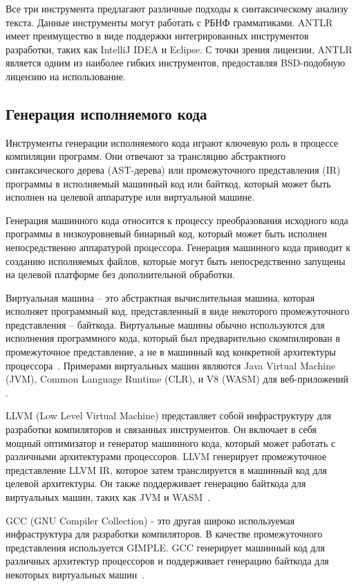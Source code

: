 Все три инструмента предлагают различные подходы к синтаксическому анализу текста.
Данные инструменты могут работать с РБНФ грамматиками.
ANTLR имеет преимущество в виде поддержки интегрированных инструментов разработки, таких как IntelliJ IDEA и Eclipse.
С точки зрения лицензии, ANTLR является одним из наиболее гибких инструментов, предоставляя BSD-подобную лицензию на использование.




\subsection{Генерация исполняемого кода}


Инструменты генерации исполняемого кода играют ключевую роль в процессе компиляции программ.
Они отвечают за трансляцию абстрактного синтаксического дерева (AST-дерева) или промежуточного представления (IR) программы в исполняемый машинный код или байткод, который может быть исполнен на целевой аппаратуре или виртуальной машине.


Генерация машинного кода относится к процессу преобразования исходного кода программы в низкоуровневый бинарный код, который может быть исполнен непосредственно аппаратурой процессора.
Генерация машинного кода приводит к созданию исполняемых файлов, которые могут быть непосредственно запущены на целевой платформе без дополнительной обработки.

Виртуальная машина -- это абстрактная вычислительная машина, которая исполняет программный код, представленный в виде некоторого промежуточного представления -- байткода.
Виртуальные машины обычно используются для исполнения программного кода, который был предварительно скомпилирован в промежуточное представление, а не в машинный код конкретной архитектуры процессора~\cite{appel1989runtime}.
Примерами виртуальных машин являются Java Virtual Machine (JVM), Common Language Runtime (CLR), и V8 (WASM) для веб-приложений .



LLVM (Low Level Virtual Machine) представляет собой инфраструктуру для разработки компиляторов и связанных инструментов.
Он включает в себя мощный оптимизатор и генератор машинного кода, который может работать с различными архитектурами процессоров.
LLVM генерирует промежуточное представление LLVM IR, которое затем транслируется в машинный код для целевой архитектуры.
Он также поддерживает генерацию байткода для виртуальных машин, таких как JVM и WASM~\cite{llvm_ofsite}.

GCC (GNU Compiler Collection) - это другая широко используемая инфраструктура для разработки компиляторов.
В качестве промежуточного представления используется GIMPLE.
GCC генерирует машинный код для различных архитектур процессоров и поддерживает генерацию байткода для некоторых виртуальных машин~\cite{vichare2008conceptual}.

